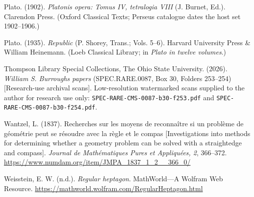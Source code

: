 \begin{thebibliography}{}
Plato. (1902). \emph{Platonis opera: Tomus IV, tetralogia VIII} (J. Burnet, Ed.). Clarendon Press.
(Oxford Classical Texts; Perseus catalogue dates the host set 1902--1906.)

Plato. (1935). \emph{Republic} (P. Shorey, Trans.; Vols. 5--6). Harvard University Press \& William Heinemann.
(Loeb Classical Library; in \emph{Plato in twelve volumes}.)

Thompson Library Special Collections, The Ohio State University. (2026).
\emph{William S. Burroughs papers} (SPEC.RARE.0087, Box 30, Folders 253--254)
[Research-use archival scans].
Low-resolution watermarked scans supplied to the author for research use only:
\texttt{SPEC-RARE-CMS-0087-b30-f253.pdf} and \texttt{SPEC-RARE-CMS-0087-b30-f254.pdf}.

Wantzel, L. (1837). Recherches sur les moyens de reconnaître si un problème de géométrie peut se résoudre
avec la règle et le compas [Investigations into methods for determining whether a geometry problem can be solved
with a straightedge and compass]. \emph{Journal de Mathématiques Pures et Appliquées, 2}, 366--372.\newline
\url{https://www.numdam.org/item/JMPA_1837_1_2__366_0/}

Weisstein, E. W. (n.d.). \emph{Regular heptagon}. MathWorld---A Wolfram Web Resource.
\url{https://mathworld.wolfram.com/RegularHeptagon.html}

\end{thebibliography}
